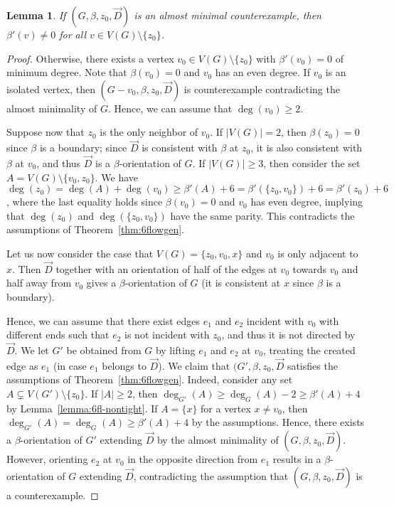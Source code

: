 \documentclass[12pt,twoside,openright,a4paper]{book}
\newtheorem{lemma}[theorem]{Lemma}
\begin{document}
\begin{lemma}\label{lemma:6fl-no0}
If $(G,\beta,z_0,\vec{D})$ is an almost minimal counterexample, then $\beta'(v)\neq 0$ for all $v\in V(G)\setminus \{z_0\}$.
\end{lemma}
\begin{proof}
Otherwise, there exists a vertex $v_0\in V(G)\setminus \{z_0\}$ with $\beta'(v_0)=0$ of minimum degree.
Note that $\beta(v_0)=0$ and $v_0$ has an even degree.
If $v_0$ is an isolated vertex, then $(G-v_0,\beta,z_0,\vec{D})$ is counterexample contradicting the almost minimality of $G$.
Hence, we can assume that $\deg(v_0)\ge 2$.

Suppose now that $z_0$ is the only neighbor of $v_0$.  If $|V(G)|=2$, then $\beta(z_0)=0$ since $\beta$ is a boundary; since $\vec{D}$ is consistent with $\beta$
at $z_0$, it is also consistent with $\beta$ at $v_0$, and thus $\vec{D}$ is a $\beta$-orientation of $G$.  If $|V(G)|\ge 3$,
then consider the set $A=V(G)\setminus\{v_0,z_0\}$.  We have
$\deg(z_0)=\deg(A)+\deg(v_0)\ge \beta'(A)+6=\beta'(\{z_0,v_0\})+6=\beta'(z_0)+6$, where the last equality holds since $\beta(v_0)=0$ and $v_0$ has even degree,
implying that $\deg(z_0)$ and $\deg(\{z_0,v_0\})$ have the same parity.  This contradicts the assumptions of Theorem~\ref{thm:6flowgen}.

Let us now consider the case that $V(G)=\{z_0,v_0,x\}$ and $v_0$ is only adjacent to $x$.
Then $\vec{D}$ together with an orientation of half of the edges at $v_0$ towards $v_0$ and half away from $v_0$ gives
a $\beta$-orientation of $G$ (it is consistent at $x$ since $\beta$ is a boundary).

Hence, we can assume that there exist edges $e_1$ and $e_2$ incident with $v_0$ with different ends such that $e_2$ is not incident with $z_0$,
and thus it is not directed by $\vec{D}$.  We let $G'$ be obtained from $G$ by lifting $e_1$ and $e_2$ at $v_0$,
treating the created edge as $e_1$ (in case $e_1$ belongs to $\vec{D}$).  We claim that $(G',\beta,z_0,\vec{D}$ satisfies the assumptions of
Theorem~\ref{thm:6flowgen}.  Indeed, consider any set $A\subsetneq V(G')\setminus \{z_0\}$.  If $|A|\ge 2$, then
$\deg_{G'}(A)\ge \deg_G(A)-2\ge \beta'(A)+4$ by Lemma~\ref{lemma:6fl-nontight}.  If $A=\{x\}$ for a vertex $x\neq v_0$,
then $\deg_{G'}(A)=\deg_G(A)\ge \beta'(A)+4$ by the assumptions.  Hence, there exists a $\beta$-orientation of $G'$ extending $\vec{D}$
by the almost minimality of $(G,\beta,z_0,\vec{D})$.  However, orienting $e_2$ at $v_0$ in the opposite direction from $e_1$ results
in a $\beta$-orientation of $G$ extending $\vec{D}$, contradicting the assumption that $(G,\beta,z_0,\vec{D})$ is a counterexample.
\end{proof}
\end{document}
